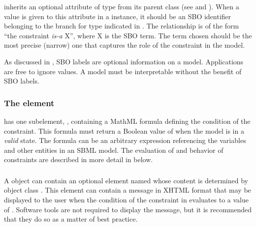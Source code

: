 \label{sec:constraint-sboterm}

\Constraint inherits an optional 
attribute of type  from its parent
class \SBase (see 
and ).  When a value is given to this
attribute in a  \Constraint instance, it should be an
SBO identifier belonging to the branch for type  \Constraint
indicated in .  The relationship is
of the form ``the constraint \emph{is-a} X'', where X is
the SBO term.  The term chosen should be the most precise (narrow)
one that captures the role of the constraint in the model.

As discussed in , SBO labels are optional
information on a model.  Applications are free to ignore
 values.  A model must be interpretable without the
benefit of SBO labels.


\subsubsection{The  element}

\Constraint has one  subelement, ,
containing a MathML formula defining the condition of the
constraint.  This formula must return a Boolean value of
  when the model is in a \emph{valid} state.  The formula
can be an arbitrary expression referencing the variables and other
entities in an SBML model.  The evaluation of  and
behavior of constraints are described in more detail in
 below.


\subsubsection{}
\label{sec:constraint-message}

A \Constraint object can contain an optional element named
 whose content is determined by object class \Message.
This element can contain a message in XHTML format that may be
displayed to the user when the condition of the constraint in
 evaluates to a value of .  Software tools
are not required to display the message, but it is recommended
that they do so as a matter of best practice.

